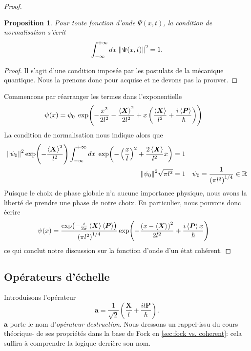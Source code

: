 \documentclass[11pt,oneside,a4paper]{article}
\newcommand{\h}{\ensuremath{\hbar}}
\newtheorem{property}[theorem]{Proposition}
\begin{document}
\begin{proof}
\begin{property}
  \label{prop:condition de normalisation anal}
    Pour toute fonction d'onde $\Psi(x,t)$, la condition de normalisation s'écrit 
    \begin{equation}
        \int_{-\infty}^{+\infty}dx \; \norm{\Psi(x,t)}^2= 1.
    \end{equation}
\end{property}
\begin{proof}
  Il s'agit d'une condition imposée par les postulats de la mécanique quantique. Nous la prenons donc pour acquise et ne devons pas la prouver.
\end{proof}
Commencons par réarranger les termes dans l'exponentielle
\begin{align}
  \psi(x) &= \psi_0 \; \exp(-\frac{x^2}{2l^2}-\frac{\expval{\bm{X}}^2}{2l^2}+x\left(\frac{\expval{\bm{X}}}{l^2}+\frac{i\expval{\bm{P}}}{\h}\right))\notag
\end{align}
La condition de normalisation nous indique alors que
\begin{align}
  \norm{\psi_0}^2 \exp(-\frac{\expval{\bm{X}}^2}{l^2})\int_{-\infty}^{+\infty} dx \; \exp(-\left(\frac{x}{l}\right)^2+\frac{2\expval{\bm{X}}}{l^2}x) &= 1\notag\\
  \norm{\psi_0}^2 \sqrt{\pi l^2} &= 1 &\psi_0 = \frac{1}{\left(\pi l^2\right)^{1/4}}\in\mathbb{R}\notag
\end{align} 
Puisque le choix de phase globale n'a aucune importance physique, nous avons la liberté de prendre une phase de notre choix. En particulier, nous pouvons donc écrire 
\begin{align}
  \psi(x) &= \frac{\exp(-\frac{i}{2\pi}\expval{\bm{X}}\expval{\bm{P}})}{\left(\pi l^2\right)^{1/4}}\exp(-\frac{\left(x-\expval{\bm{X}}\right)^2}{2l^2}+\frac{i\expval{\bm{P}}x}{\hbar})\notag
\end{align}
ce qui conclut notre discussion sur la fonction d'onde d'un état cohérent. \end{proof}
\subsection{Opérateurs d'échelle} \label{opérateur d'échelle}
Introduisons l'opérateur
\begin{equation}
  \bm{a} = \frac{1}{\sqrt{2}}\left(\frac{\bm{X}}{l}+\frac{il\bm{P}}{\h}\right).
\end{equation}
$\bm{a}$ porte le nom d'\emph{opérateur destruction}. Nous dressons un rappel-issu du cours théorique- de ses propriétés dans la base de Fock en \ref{sec:fock vs. coherent}: cela suffira à comprendre la logique derrière son nom.
\end{document}

